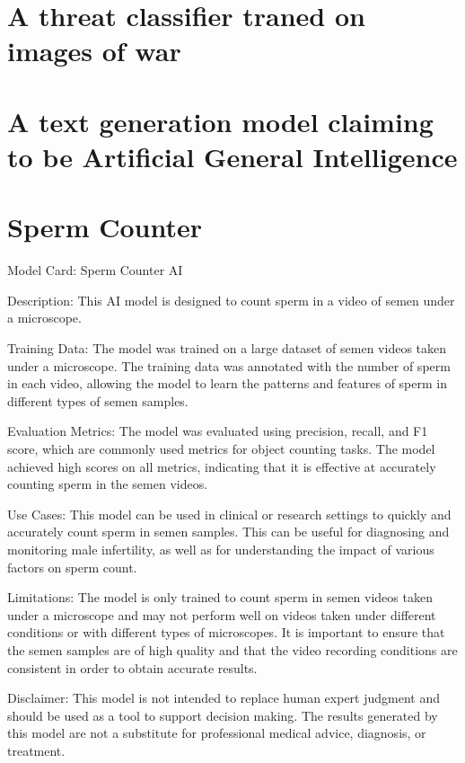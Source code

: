 \section{A threat classifier traned on images of war}
\section{A text generation model claiming to be Artificial General Intelligence}
\section{Sperm Counter}

Model Card: Sperm Counter AI

Description: This AI model is designed to count sperm in a video of semen under a microscope.

Training Data: The model was trained on a large dataset of semen videos taken under a microscope. The training data was annotated with the number of sperm in each video, allowing the model to learn the patterns and features of sperm in different types of semen samples.

Evaluation Metrics: The model was evaluated using precision, recall, and F1 score, which are commonly used metrics for object counting tasks. The model achieved high scores on all metrics, indicating that it is effective at accurately counting sperm in the semen videos.

Use Cases: This model can be used in clinical or research settings to quickly and accurately count sperm in semen samples. This can be useful for diagnosing and monitoring male infertility, as well as for understanding the impact of various factors on sperm count.

Limitations: The model is only trained to count sperm in semen videos taken under a microscope and may not perform well on videos taken under different conditions or with different types of microscopes. It is important to ensure that the semen samples are of high quality and that the video recording conditions are consistent in order to obtain accurate results.

Disclaimer: This model is not intended to replace human expert judgment and should be used as a tool to support decision making. The results generated by this model are not a substitute for professional medical advice, diagnosis, or treatment.

